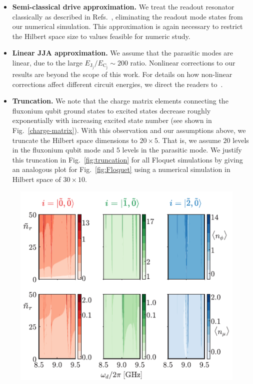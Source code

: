 \documentclass[%
reprint,
superscriptaddress,
 amsmath,amssymb,
 aps,
 prx,
longbibliography,
floatfix,
]{revtex4-2}
\begin{document}
{\begin{itemize}
    \item \textbf{Semi-classical drive approximation.}  We treat the readout resonator classically as described in Refs.~\cite{xiao2023diagrammatic,dumas2024unified,cohen2023reminiscence,khezri2023measurement}, eliminating the readout mode states from our numerical simulation. This approximation is again necessary to restrict the Hilbert space size to values feasible for numeric study.
    
    \item \textbf{Linear JJA approximation.} We assume that the parasitic modes are linear, due to the large $E_{\textrm{J}_\textrm{j}}/E_{\textrm{C}_\textrm{j}} \sim 200$ ratio. Nonlinear corrections to our results are beyond the scope of this work. For details on how non-linear corrections affect different circuit energies, we direct the readers to~\cite{viola2015collective}. 
    \item \textbf{Truncation.} We note that the charge matrix elements connecting the fluxonium qubit ground states to excited states decrease roughly exponentially with increasing excited state number (see shown in Fig.~\ref{charge-matrix}). With this observation and our assumptions above, we truncate the Hilbert space dimensions to $20\times 5$. That is, we assume $20$ levels in the fluxonium qubit mode and $5$ levels in the parasitic mode. We justify this truncation in Fig.~\ref{fig:truncation} for all Floquet simulations by giving an analogous plot for Fig.~\ref{fig:Floquet} using a numerical simulation in Hilbert space of $30\times 10$.
    \end{itemize}
\begin{figure}[t]
        \centering
        \includegraphics[width=\linewidth]{Fluxonium_Readout_manuscript/Supp_Fig/Tuncation.pdf}

\end{figure}}
\end{document}
